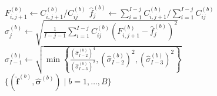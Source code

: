 \documentclass[a4paper]{book}
\begin{document}
\begin{figure}[p]
\begin{algorithm}[H]
\begin{algorithmic}
            \State $\displaystyle F^{(b)}_{i, j + 1} \gets C^{(b)}_{i, j + 1} / C^{(b)}_{ij}$
          \EndFor
          \State $\widehat{f}^{(b)}_j \gets \sum_{i = 1}^{I - j} C^{(b)}_{i, j + 1} / \sum_{i = 1}^{I - j} C^{(b)}_{ij}$
            \State $\displaystyle \widehat{\sigma}^{(b)}_j \gets \sqrt{\frac{1}{I - j - 1}\sum_{i = 1}^{I-j} C^{(b)}_{ij}\left( F^{(b)}_{i, j + 1} - \widehat{f}^{(b)}_j \right)^2}$
          \Else
            \State $\widehat{\sigma}^{(b)}_{I - 1} \gets \sqrt{\min{ \left \{ \displaystyle \frac{(\widehat{\sigma}^{(b)}_{I - 2})^4}{(\widehat{\sigma}^{(b)}_{I - 3})^2}, (\widehat{\sigma}^{(b)}_{I - 2})^2, (\widehat{\sigma}^{(b)}_{I - 3})^2 \right \} }}$
          \EndIf
        \EndFor
      \EndFor
      \State \Return $\{ (\widehat{\bm{f}}^{(b)}, \widehat{\bm{\sigma}}^{(b)}) \mid b = 1, \dots, B \}$
    \end{algorithmic}
  \end{algorithm}
\end{figure}
\end{document}
